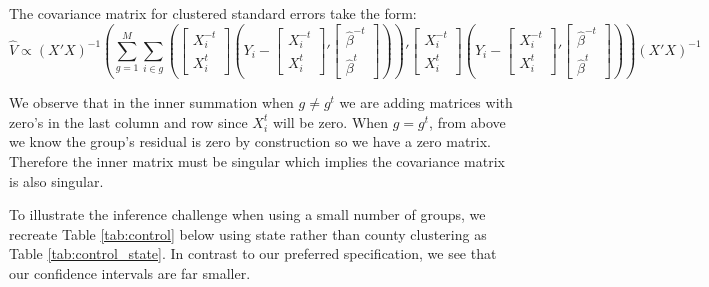 \documentclass[12pt]{article}
\begin{document}
The covariance matrix for clustered standard errors take the form:
$$ \hat{V} \propto (X'X)^{-1} \left( \sum_{g=1}^{M} \sum_{i \in g} \left(\begin{bmatrix}
X_i^{-t} \\  X_i^t 
\end{bmatrix}(Y_i - \begin{bmatrix}
X_i^{-t} \\  X_i^t 
\end{bmatrix}' \begin{bmatrix}
\hat{\beta}^{-t} \\ \hat{\beta}^t 
\end{bmatrix})\right)' \begin{bmatrix}
X_i^{-t} \\  X_i^t 
\end{bmatrix}(Y_i - \begin{bmatrix}
X_i^{-t} \\  X_i^t 
\end{bmatrix}' \begin{bmatrix}
\hat{\beta}^{-t} \\ \hat{\beta}^t 
\end{bmatrix})  \right)  (X'X)^{-1}$$ 

We observe that in the inner summation when $g \ne g^t$ we are adding matrices with zero's in the last column and row since $X^t_i$ will be zero. When $g = g^t$, from above we know the group's residual is zero by construction so we have a zero matrix. Therefore the inner matrix must be singular which implies the covariance matrix is also singular. 

To illustrate the inference challenge when using a small number of groups, we recreate Table \ref{tab:control} below using state rather than county clustering as Table \ref{tab:control_state}. In contrast to our preferred specification, we see that our confidence intervals are far smaller. 
\end{document}
